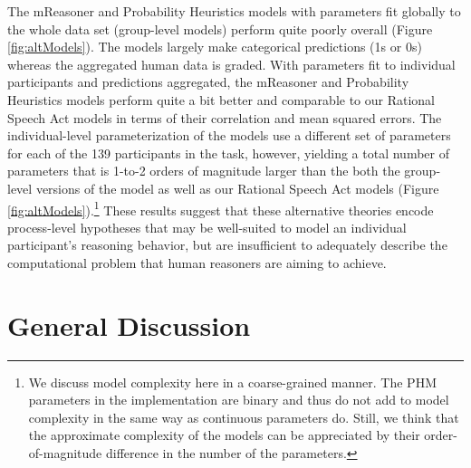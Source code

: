 \documentclass[floatsintext, doc]{apa6}
\begin{document}

The mReasoner and Probability Heuristics models with parameters fit globally to the whole data set (group-level models) perform quite poorly overall (Figure \ref{fig:altModels}). 
The models largely make categorical predictions (1s or 0s) whereas the aggregated human data is graded.
With parameters fit to individual participants and predictions aggregated, the mReasoner and Probability Heuristics models perform quite a bit better and comparable to our Rational Speech Act models in terms of their correlation and mean squared errors.
The individual-level parameterization of the models use a different set of parameters for each of the 139 participants in the task, however, yielding a total number of parameters that is 1-to-2 orders of magnitude larger than the both the group-level versions of the model as well as our Rational Speech Act models (Figure \ref{fig:altModels}).\footnote{We discuss model complexity here in a coarse-grained manner. The PHM parameters in the  implementation are binary and thus do not add to model complexity in the same way as continuous parameters do. Still, we think that the approximate complexity of the models can be appreciated by their order-of-magnitude difference in the number of the parameters.}
These results suggest that these alternative theories encode process-level hypotheses that may be well-suited to model an individual participant's reasoning behavior, but are insufficient to adequately describe the computational problem that human reasoners are aiming to achieve. 










\section{General Discussion}
\end{document}
